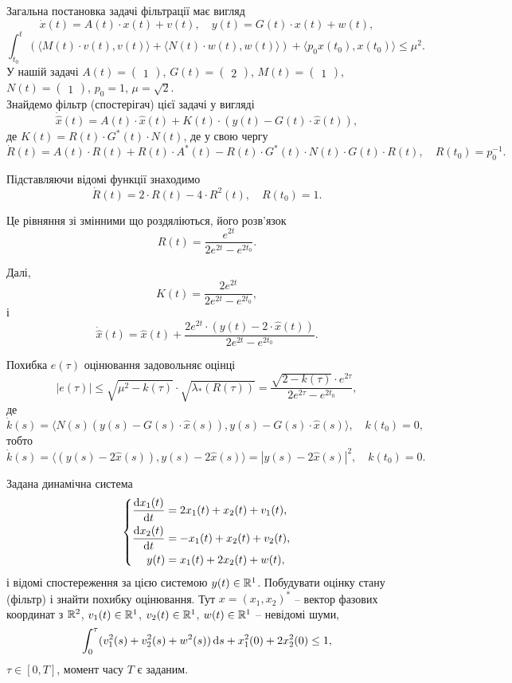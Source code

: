 \begin{solution}
	Загальна постановка задачі фільтрації має вигляд \[ \dot x (t)= A (t) \cdot x (t)+ v (t), \quad y (t)= G (t) \cdot x(t) + w(t),\] \[\int_{t_0}^t ( \langle M(t) \cdot v(t), v(t)\rangle + \langle N(t) \cdot w(t), w(t)\rangle )  + \langle p_0 x(t_0), x(t_0) \rangle \le \mu^2. \] У нашій задачі $A (t)= \begin{pmatrix} 1 \end{pmatrix}$, $G (t)= \begin{pmatrix} 2 \end{pmatrix}$, $M (t)= \begin{pmatrix} 1 \end{pmatrix}$, $N (t)= \begin{pmatrix} 1 \end{pmatrix}$, $p_0 = 1$, $\mu = \sqrt{2}$. \\

	Знайдемо фільтр (спостерігач) цієї задачі у вигляді \[ \dot{\hat{x}} (t) = A (t) \cdot \hat x (t) + K (t) \cdot (y (t) - G (t) \cdot \hat x (t)), \] де $K (t)= R (t) \cdot G^* (t) \cdot N(t)$, де у свою чергу \[\dot R (t)= A (t) \cdot R (t)+ R (t) \cdot A^* (t)- R (t) \cdot G^* (t) \cdot N (t) \cdot G (t) \cdot R(t), \quad R(t_0) = p_0^{-1}. \]

 	Підставляючи відомі функції знаходимо \[\dot R (t)= 2 \cdot R (t) - 4 \cdot R^2(t), \quad R(t_0) = 1. \]

 	Це рівняння зі змінними що роздяліються, його розв'язок \[ R(t) = \frac{e^{2t}}{2e^{2t}-e^{2t_0}}. \]

 	Далі, \[ K(t) = \frac{2 e^{2t}}{2e^{2t}-e^{2t_0}}, \] і \[ \dot{\hat{x}} (t) = \hat x (t) + \frac{2 e^{2t} \cdot (y (t) - 2 \cdot \hat x (t))}{2e^{2t}-e^{2t_0}}. \]

 	Похибка $e(\tau)$ оцінювання задовольняє оцінці \[ |e(\tau)| \le \sqrt{\mu^2-k(\tau)} \cdot \sqrt{\lambda_* (R(\tau))} = \frac{ \sqrt{2 - k(\tau)} \cdot e^{2\tau}}{2e^{2\tau}-e^{2t_0}},\] де \[ \dot k (s) = \langle N(s) (y(s) - G(s) \cdot \hat x(s)), y(s) - G(s) \cdot \hat x(s)\rangle, \quad k(t_0) = 0, \] тобто \[ \dot k (s) = \langle (y(s) - 2 \hat x(s)), y(s) - 2 \hat x(s)\rangle = |y(s) - 2 \hat x(s)|^2, \quad k(t_0) = 0. \]
\end{solution}

\begin{problem}
	Задана динамічна система \[ \left\{ \begin{aligned}
		\frac{\mathop{}\!\mathrm{d} x_1(t)}{\mathop{}\!\mathrm{d} t} &= 2 x_1(t) + x_2(t) + v_1(t), \\
		\frac{\mathop{}\!\mathrm{d} x_2(t)}{\mathop{}\!\mathrm{d} t} &= - x_1(t) + x_2(t) + v_2(t), \\
		y(t) &= x_1(t) + 2 x_2(t) + w(t),
	\end{aligned} \right. \] і відомі спостереження за цією системою $y(t) \in \mathbb{R}^1$.  Побудувати оцінку стану (фільтр) і знайти похибку оцінювання. Тут $x = (x_1, x_2)^*$ -- вектор фазових координат з $\mathbb{R}^2$, $v_1 (t) \in \mathbb{R}^1$, $v_2 (t) \in \mathbb{R}^1$, $w(t) \in \mathbb{R}^1$ -- невідомі шуми, \[ \int_0^\tau (v_1^2(s) + v_2^2(s) + w^2(s)) \mathop{}\!\mathrm{d} s + x_1^2(0) + 2 x_2^2(0) \le 1,\] $\tau \in [0, T]$, момент часу $T$ є заданим.
\end{problem}

